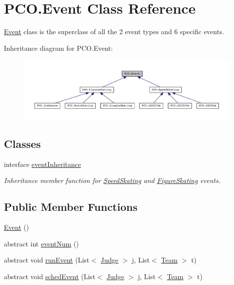 \hypertarget{classPCO_1_1Event}{\section{P\+C\+O.\+Event Class Reference}
\label{classPCO_1_1Event}
}


\hyperlink{classPCO_1_1Event}{Event} class is the superclass of all the 2 event types and 6 specific events.  




Inheritance diagram for P\+C\+O.\+Event\+:\nopagebreak
\begin{figure}[H]
\begin{center}
\leavevmode
\includegraphics[width=350pt]{classPCO_1_1Event__inherit__graph}
\end{center}
\end{figure}
\subsection*{Classes}
\begin{DoxyCompactItemize}
\item 
interface \hyperlink{interfacePCO_1_1Event_1_1eventInheritance}{event\+Inheritance}
\begin{DoxyCompactList}\small\item\em Inheritance member function for \hyperlink{classPCO_1_1SpeedSkating}{Speed\+Skating} and \hyperlink{classPCO_1_1FigureSkating}{Figure\+Skating} events. \end{DoxyCompactList}\end{DoxyCompactItemize}
\subsection*{Public Member Functions}
\begin{DoxyCompactItemize}
\item 
\hyperlink{classPCO_1_1Event_a55055f951cbfc76c9d62086b25aa93d0}{Event} ()
\item 
abstract int \hyperlink{classPCO_1_1Event_a89e26f29f5cfc92627bbb5a5e4ca1053}{event\+Num} ()
\item 
abstract void \hyperlink{classPCO_1_1Event_ad47d86904767dfebc731be328ec0958d}{run\+Event} (List$<$ \hyperlink{classPCO_1_1Judge}{Judge} $>$ j, List$<$ \hyperlink{classPCO_1_1Team}{Team} $>$ t)
\item 
abstract void \hyperlink{classPCO_1_1Event_a6a19f71e79d0f498ba74c9cd86c27eaa}{sched\+Event} (List$<$ \hyperlink{classPCO_1_1Judge}{Judge} $>$ j, List$<$ \hyperlink{classPCO_1_1Team}{Team} $>$ t)
\end{DoxyCompactItemize}


